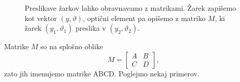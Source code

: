 \begin{figure}[h]
\centering
\centering
\def\svgwidth{100truemm}

\caption{Preslikave žarkov lahko obravnavamo
z matrikami. Žarek zapišemo kot vektor $(y,\vartheta)$, optični element pa opišemo z matriko $M$, 
ki žarek $(y_{1},\vartheta_{1})$ preslika v $(y_{2},\vartheta_{2})$.}
\label{fig:K-matricni-obravnavi}
\end{figure}

Matrike $M$ so na splošno oblike
\begin{equation}
M = \left[\begin{array}{cc}
A & B\\
C & D
\end{array}\right],
\label{eq:ABCDdef}
\end{equation}
zato jih imenujemo matrike ABCD. Poglejmo nekaj primerov. 

